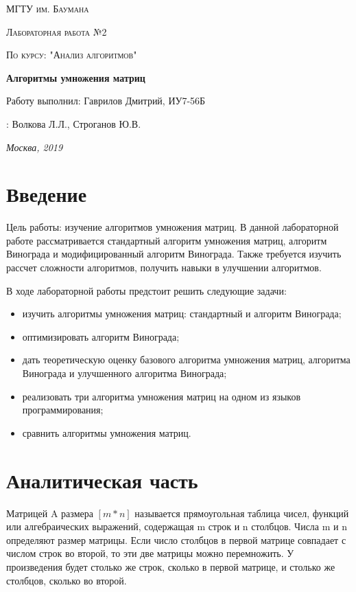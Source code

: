 \documentclass[12pt]{report}
\begin{document}
\begin{titlepage}
	\centering
	{\scshape\LARGE МГТУ им. Баумана \par}
	\vspace{3cm}
	{\scshape\Large Лабораторная работа №2\par}
	\vspace{0.5cm}	
	{\scshape\Large По курсу: "Анализ алгоритмов"\par}
	\vspace{1.5cm}
	{\huge\bfseries Алгоритмы умножения матриц\par}
	\vspace{2cm}
	\Large Работу выполнил: Гаврилов Дмитрий, ИУ7-56Б\par
	\vspace{0.5cm}
	:  Волкова Л.Л., Строганов Ю.В.\par

	\vfill
	\large \textit {Москва, 2019} \par
\end{titlepage}

\tableofcontents

\newpage
\chapter*{Введение}
Цель работы: изучение алгоритмов умножения матриц. В данной лабораторной работе рассматривается стандартный алгоритм умножения матриц, алгоритм Винограда и модифицированный алгоритм Винограда.  Также требуется изучить рассчет сложности алгоритмов, получить навыки в улучшении алгоритмов.


В ходе лабораторной работы предстоит решить следующие задачи:
\begin{itemize}
	\item изучить алгоритмы умножения матриц: стандартный и алгоритм Винограда; 
	\item оптимизировать алгоритм Винограда; 
	\item дать теоретическую оценку базового алгоритма умножения матриц, алгоритма Винограда и улучшенного алгоритма Винограда;
	\item реализовать три алгоритма умножения матриц на одном из языков программирования;  
	\item сравнить алгоритмы умножения матриц.
\end{itemize}



\chapter{Аналитическая часть}
Матрицей A размера $[m*n]$ называется прямоугольная таблица
чисел, функций или алгебраических выражений, содержащая m строк и n столбцов. Числа m и n определяют размер матрицы.\cite{Beloysov} Если число столбцов в первой матрице совпадает с числом строк во второй, то эти две матрицы можно перемножить. У произведения будет столько же строк, сколько в первой матрице, и столько же столбцов, сколько во второй.
	    
\end{document}

